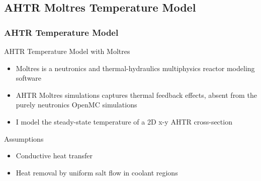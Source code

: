 \subsection{AHTR Moltres Temperature Model}
\begin{frame}
    \frametitle{AHTR Temperature Model}
    \begin{block}{AHTR Temperature Model with Moltres}
        \begin{itemize}
            \item Moltres is a neutronics and thermal-hydraulics multiphysics reactor 
            modeling software
            \item AHTR Moltres simulations captures thermal feedback effects, absent
            from the purely neutronics OpenMC simulations
            \item I model the steady-state temperature of a 2D x-y AHTR cross-section
        \end{itemize}
    \end{block}
    \begin{block}{Assumptions}
        \begin{itemize}
            \item Conductive heat transfer 
            \item Heat removal by uniform salt flow in coolant regions
        \end{itemize}
    \end{block}

\end{frame}

